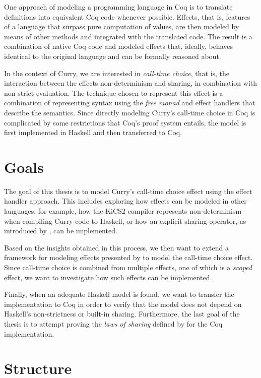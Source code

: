 \documentclass[a4paper, 11pt, fleqn, twoside]{scrreprt}
\begin{document}
One approach of modeling a programming language in Coq is to translate definitions into equivalent Coq code whenever possible.
Effects, that is, features of a language that surpass pure computation of values, are then modeled by means of other methods and integrated with the translated code.
The result is a combination of native Coq code and modeled effects that, ideally, behaves identical to the original language and can be formally reasoned about.

In the context of Curry, we are interested in \textit{call-time choice}, that is, the interaction between the effects non-determinism and sharing, in combination with non-strict evaluation.
The technique chosen to represent this effect is a combination of representing syntax using the \textit{free monad} and effect handlers that describe the semantics.
Since directly modeling Curry's call-time choice in Coq is complicated by some restrictions that Coq's proof system entails, the model is first implemented in Haskell and then transferred to Coq.

\section{Goals}

The goal of this thesis is to model Curry's call-time choice effect using the effect handler approach.
This includes exploring how effects can be modeled in other languages, for example, how the KiCS2 compiler represents non-determinism when compiling Curry code to Haskell, or how an explicit sharing operator, as introduced by \citet{fischer2009purely}, can be implemented.

Based on the insights obtained in this process, we then want to extend a framework for modeling effects presented by \citet{wu2014effect} to model the call-time choice effect.
Since call-time choice is combined from multiple effects, one of which is a \textit{scoped} effect, we want to investigate how such effects can be implemented.

Finally, when an adequate Haskell model is found, we want to transfer the implementation to Coq in order to verify that the model does not depend on Haskell's non-strictness or built-in sharing.
Furthermore, the last goal of the thesis is to attempt proving the \textit{laws of sharing} defined by \citet{fischer2009purely} for the Coq implementation.

\section{Structure}
\end{document}
